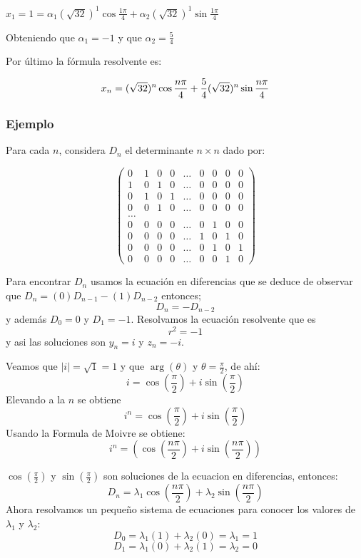 \documentclass{article}
\begin{document}
      $x_{1}=1=\alpha_{1}(\sqrt{32})^1\cos{\frac{1\pi}{4}} + \alpha_{2}(\sqrt{32})^1\sin{\frac{1\pi}{4}}$

        Obteniendo que $\alpha_{1}=-1$ y que $\alpha_{2}=\frac{5}{4}$

        Por último la fórmula resolvente es:

         $$x_{n}=\-(\sqrt{32})^n\cos{\frac{n\pi}{4}} + \frac{5}{4}(\sqrt{32})^n\sin{\frac{n\pi}{4}}$$

\subsubsection{Ejemplo}

Para cada $n$, considera $D_{n}$ el determinante $n\times n$ dado por:

\begin{equation*}
\begin{pmatrix}
0 & 1 & 0 & 0 &\ldots & 0 & 0 & 0 & 0\\
1 & 0 & 1 & 0 &\ldots & 0 & 0 & 0 & 0\\
0 & 1 & 0 & 1 &\ldots & 0 & 0 & 0 & 0\\
0 & 0 & 1 & 0 &\ldots & 0 & 0 & 0 & 0\\
\ldots\\
0 & 0 & 0 & 0 &\ldots & 0 & 1 & 0 & 0\\
0 & 0 & 0 & 0 &\ldots & 1 & 0 & 1 & 0\\
0 & 0 & 0 & 0 &\ldots & 0 & 1 & 0 & 1\\
0 & 0 & 0 & 0 &\ldots & 0 & 0 & 1 & 0
\end{pmatrix}
\end{equation*}


Para encontrar $D_{n}$ usamos la ecuación en diferencias que se deduce de observar
que $D_{n}=(0)D_{n-1}-(1)D_{n-2}$ entonces;
\begin{equation}
  \label{determinante}
D_{n}=-D_{n-2}
\end{equation}
 y además $D_{0}=0$ y $D_{1}=-1$.
Resolvamos la ecuación resolvente que es $$r^{2}=-1$$ y asi las soluciones son $y_{n}=i$ y  $z_{n}=-i$.

Veamos que  $|i|=\sqrt{1}=1$ y que $\arg(\theta)$ y $\theta= \frac{\pi}{2}$, de ahí:
$$i=\cos(\frac{\pi}{2})+i\sin(\frac{\pi}{2})$$
Elevando a la $n$ se obtiene
$$i^n=\cos(\frac{\pi}{2})+i\sin(\frac{\pi}{2})$$
Usando la Formula de Moivre se obtiene:
$$i^n=(\cos(\frac{n\pi}{2})+i\sin(\frac{n\pi}{2}))$$

$\cos(\frac{\pi}{2})$ y  $\sin(\frac{\pi}{2})$ son soluciones de la ecuacion en diferencias, entonces: 
$$D_{n}=\lambda_{1}\cos(\frac{n\pi}{2})+\lambda_{2}\sin(\frac{n\pi}{2})$$
Ahora resolvamos un pequeño sistema de ecuaciones para conocer los valores de $\lambda_1$ y $\lambda_2$:
  $$D_{0}=\lambda_{1}(1)+\lambda_{2}(0)=\lambda_{1}=1$$
  $$D_{1}=\lambda_{1}(0)+\lambda_{2}(1)=\lambda_{2}=0$$
\end{document}
